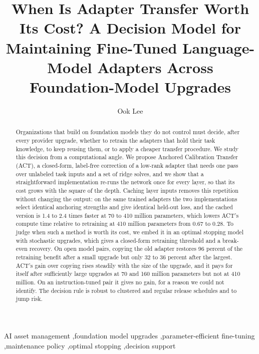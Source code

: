 \documentclass[preprint,12pt,authoryear]{elsarticle}
\begin{document}
\begin{frontmatter}

\title{When Is Adapter Transfer Worth Its Cost? A Decision Model for Maintaining Fine-Tuned Language-Model Adapters Across Foundation-Model Upgrades}

\author[inst1]{Ook Lee}
\address[inst1]{Department of Information System, Hanyang University, Seoul, Republic of Korea}

\begin{abstract}
Organizations that build on foundation models they do not control must decide, after every provider upgrade, whether to retrain the adapters that hold their task knowledge, to keep reusing them, or to apply a cheaper transfer procedure. We study this decision from a computational angle. We propose Anchored Calibration Transfer (ACT), a closed-form, label-free correction of a low-rank adapter that needs one pass over unlabeled task inputs and a set of ridge solves, and we show that a straightforward implementation re-runs the network once for every layer, so that its cost grows with the square of the depth. Caching layer inputs removes this repetition without changing the output: on the same trained adapters the two implementations select identical anchoring strengths and give identical held-out loss, and the cached version is 1.4 to 2.4 times faster at 70 to 410 million parameters, which lowers ACT's compute time relative to retraining at 410 million parameters from 0.67 to 0.28. To judge when such a method is worth its cost, we embed it in an optimal stopping model with stochastic upgrades, which gives a closed-form retraining threshold and a break-even recovery. On open model pairs, copying the old adapter restores 96 percent of the retraining benefit after a small upgrade but only 32 to 36 percent after the largest. ACT's gain over copying rises steadily with the size of the upgrade, and it pays for itself after sufficiently large upgrades at 70 and 160 million parameters but not at 410 million. On an instruction-tuned pair it gives no gain, for a reason we could not identify. The decision rule is robust to clustered and regular release schedules and to jump risk.
\end{abstract}

\begin{keyword}
AI asset management \sep foundation model upgrades \sep parameter-efficient fine-tuning \sep maintenance policy \sep optimal stopping \sep decision support
\end{keyword}

\end{frontmatter}
\end{document}
